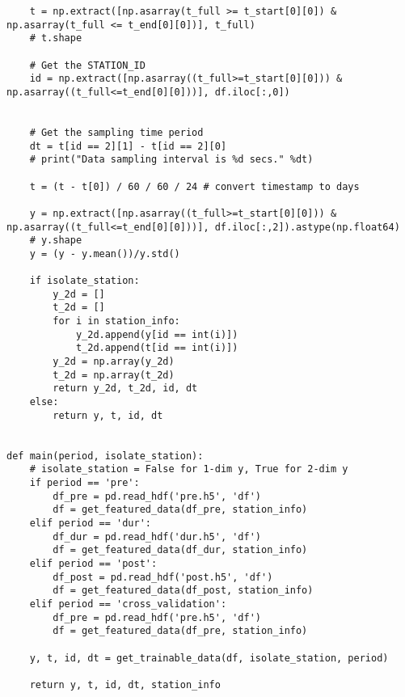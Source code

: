 \begin{lstlisting}
    t = np.extract([np.asarray(t_full >= t_start[0][0]) &  np.asarray(t_full <= t_end[0][0])], t_full)
    # t.shape
    
    # Get the STATION_ID 
    id = np.extract([np.asarray((t_full>=t_start[0][0])) & np.asarray((t_full<=t_end[0][0]))], df.iloc[:,0]) 

    
    # Get the sampling time period
    dt = t[id == 2][1] - t[id == 2][0]
    # print("Data sampling interval is %d secs." %dt)

    t = (t - t[0]) / 60 / 60 / 24 # convert timestamp to days
    
    y = np.extract([np.asarray((t_full>=t_start[0][0])) & np.asarray((t_full<=t_end[0][0]))], df.iloc[:,2]).astype(np.float64)
    # y.shape
    y = (y - y.mean())/y.std()
    
    if isolate_station:
        y_2d = []
        t_2d = []
        for i in station_info:
            y_2d.append(y[id == int(i)])
            t_2d.append(t[id == int(i)])
        y_2d = np.array(y_2d)
        t_2d = np.array(t_2d)
        return y_2d, t_2d, id, dt
    else:
        return y, t, id, dt


def main(period, isolate_station):
    # isolate_station = False for 1-dim y, True for 2-dim y
    if period == 'pre':
        df_pre = pd.read_hdf('pre.h5', 'df')
        df = get_featured_data(df_pre, station_info)
    elif period == 'dur':
        df_dur = pd.read_hdf('dur.h5', 'df')
        df = get_featured_data(df_dur, station_info)
    elif period == 'post':
        df_post = pd.read_hdf('post.h5', 'df')
        df = get_featured_data(df_post, station_info)
    elif period == 'cross_validation':
        df_pre = pd.read_hdf('pre.h5', 'df')
        df = get_featured_data(df_pre, station_info)
        
    y, t, id, dt = get_trainable_data(df, isolate_station, period)
    
    return y, t, id, dt, station_info
\end{lstlisting}


